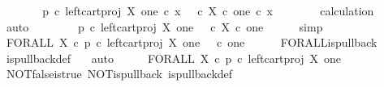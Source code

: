 \begin{isabellebody}
\ \ \ \ \isamarkupfalse%
\ \isamarkupfalse%
\ {\isachardoublequoteopen}{\isacharparenleft}{\kern0pt}p\ {\isasymcirc}\isactrlsub c\ left{\isacharunderscore}{\kern0pt}cart{\isacharunderscore}{\kern0pt}proj\ X\ one{\isacharparenright}{\kern0pt}\ {\isasymcirc}\isactrlsub c\ x\ {\isacharequal}{\kern0pt}\ {\isacharparenleft}{\kern0pt}{\isasymt}\ {\isasymcirc}\isactrlsub c\ {\isasymbeta}\isactrlbsub X\ {\isasymtimes}\isactrlsub c\ one\isactrlesub {\isacharparenright}{\kern0pt}\ {\isasymcirc}\isactrlsub c\ x{\isachardoublequoteclose}\isanewline
\ \ \ \ \ \ \isamarkupfalse%
\ calculation\ \isamarkupfalse%
\ auto\isanewline
\ \ \isamarkupfalse%
\isanewline
\ \ \isamarkupfalse%
\ \isamarkupfalse%
\ {\isachardoublequoteopen}{\isacharparenleft}{\kern0pt}p\ {\isasymcirc}\isactrlsub c\ left{\isacharunderscore}{\kern0pt}cart{\isacharunderscore}{\kern0pt}proj\ X\ one{\isacharparenright}{\kern0pt}\isactrlsup {\isasymsharp}\ {\isacharequal}{\kern0pt}\ {\isacharparenleft}{\kern0pt}{\isasymt}\ {\isasymcirc}\isactrlsub c\ {\isasymbeta}\isactrlbsub X\ {\isasymtimes}\isactrlsub c\ one\isactrlesub {\isacharparenright}{\kern0pt}\isactrlsup {\isasymsharp}{\isachardoublequoteclose}\isanewline
\ \ \ \ \isamarkupfalse%
\ simp\isanewline
\ \ \isamarkupfalse%
\ \isamarkupfalse%
\ {\isachardoublequoteopen}FORALL\ X\ {\isasymcirc}\isactrlsub c\ {\isacharparenleft}{\kern0pt}p\ {\isasymcirc}\isactrlsub c\ left{\isacharunderscore}{\kern0pt}cart{\isacharunderscore}{\kern0pt}proj\ X\ one{\isacharparenright}{\kern0pt}\isactrlsup {\isasymsharp}\ {\isacharequal}{\kern0pt}\ {\isasymt}\ {\isasymcirc}\isactrlsub c\ {\isasymbeta}\isactrlbsub one\isactrlesub {\isachardoublequoteclose}\isanewline
\ \ \ \ \isamarkupfalse%
\ FORALL{\isacharunderscore}{\kern0pt}is{\isacharunderscore}{\kern0pt}pullback\ \isamarkupfalse%
\ is{\isacharunderscore}{\kern0pt}pullback{\isacharunderscore}{\kern0pt}def\ \ \isamarkupfalse%
\ auto\isanewline
\ \ \isamarkupfalse%
\ \isamarkupfalse%
\ {\isachardoublequoteopen}FORALL\ X\ {\isasymcirc}\isactrlsub c\ {\isacharparenleft}{\kern0pt}p\ {\isasymcirc}\isactrlsub c\ left{\isacharunderscore}{\kern0pt}cart{\isacharunderscore}{\kern0pt}proj\ X\ one{\isacharparenright}{\kern0pt}\isactrlsup {\isasymsharp}\ {\isacharequal}{\kern0pt}\ {\isasymt}{\isachardoublequoteclose}\isanewline
\ \ \ \ \isamarkupfalse%
\ NOT{\isacharunderscore}{\kern0pt}false{\isacharunderscore}{\kern0pt}is{\isacharunderscore}{\kern0pt}true\ NOT{\isacharunderscore}{\kern0pt}is{\isacharunderscore}{\kern0pt}pullback\ is{\isacharunderscore}{\kern0pt}pullback{\isacharunderscore}{\kern0pt}def\ \ \isamarkupfalse%

\end{isabellebody}
